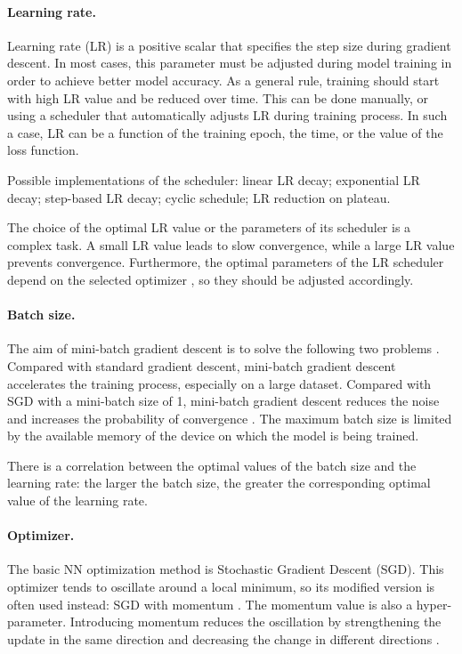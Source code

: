 \documentclass[reprint,
superscriptaddress,
amsmath,amssymb,aps,showkeys,showpacs,
twoside,final,secnumarabic,%
nofootinbib]{revtex4-2}
\begin{document}
\paragraph*{Learning rate.}
Learning rate (LR) is a positive scalar that specifies the step size during gradient descent. In most cases, this parameter must be adjusted during model training in order to achieve better model accuracy. As a general rule, training should start with high LR value and be reduced over time. This can be done manually, or using a scheduler that automatically adjusts LR during training process. In such a case, LR can be a function of the training epoch, the time, or the value of the loss function.

Possible implementations of the scheduler: linear LR decay; exponential LR decay; step-based LR decay; cyclic schedule; LR reduction on plateau.

The choice of the optimal LR value or the parameters of its scheduler is a complex task. A small LR value leads to slow convergence, while a large LR value prevents convergence. Furthermore, the optimal parameters of the LR scheduler depend on the selected optimizer \cite{bib12}, so they should be adjusted accordingly.

\paragraph*{Batch size.}
The aim of mini-batch gradient descent is to solve the following two problems \cite{bib13}. Compared with standard gradient descent, mini-batch gradient descent accelerates the training process, especially on a large dataset. Compared with SGD with a mini-batch size of 1, mini-batch gradient descent reduces the noise and increases the probability of convergence \cite{bib14}. The maximum batch size is limited by the available memory of the device on which the model is being trained.

There is a correlation between the optimal values of the batch size and the learning rate: the larger the batch size, the greater the corresponding optimal value of the learning rate.

\paragraph*{Optimizer.}
The basic NN optimization method is Stochastic Gradient Descent (SGD). This optimizer tends to oscillate around a local minimum, so its modified version is often used instead: SGD with momentum \cite{bib15}. The momentum value is also a hyper-parameter. Introducing momentum reduces the oscillation by strengthening the update in the same direction and decreasing the change in different directions .
\end{document}
